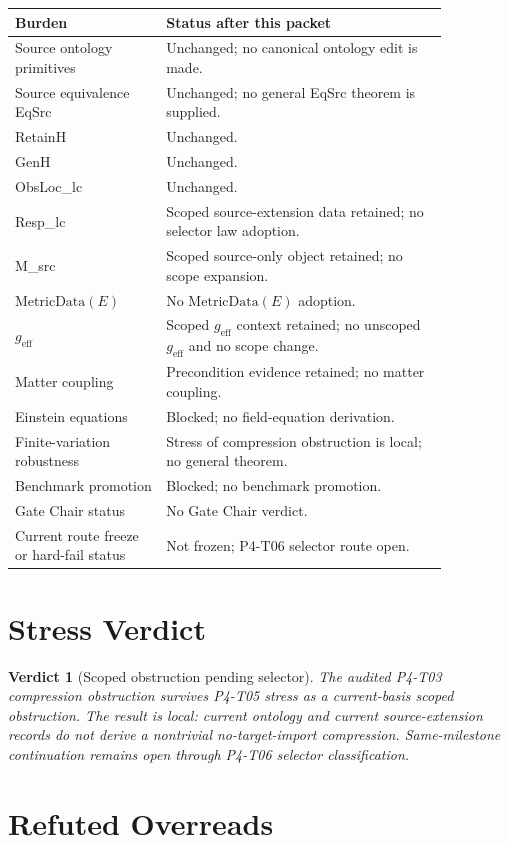 \documentclass[11pt]{article}
\newcommand{\MetricData}{\mathrm{MetricData}}
\newcommand{\geff}{g_{\mathrm{eff}}}
\newtheorem{verdict}{Verdict}
\begin{document}
\begin{longtable}{p{0.30\linewidth}p{0.56\linewidth}}
\toprule
Burden & Status after this packet \\
\midrule
Source ontology primitives & Unchanged; no canonical ontology edit is made. \\
Source equivalence EqSrc & Unchanged; no general EqSrc theorem is supplied. \\
RetainH & Unchanged. \\
GenH & Unchanged. \\
ObsLoc\_lc & Unchanged. \\
Resp\_lc & Scoped source-extension data retained; no selector law adoption. \\
M\_src & Scoped source-only object retained; no scope expansion. \\
\(\MetricData(E)\) & No \(\MetricData(E)\) adoption. \\
\(\geff\) & Scoped \(\geff\) context retained; no unscoped \(\geff\) and no scope change. \\
Matter coupling & Precondition evidence retained; no matter coupling. \\
Einstein equations & Blocked; no field-equation derivation. \\
Finite-variation robustness & Stress of compression obstruction is local; no general theorem. \\
Benchmark promotion & Blocked; no benchmark promotion. \\
Gate Chair status & No Gate Chair verdict. \\
Current route freeze or hard-fail status & Not frozen; P4-T06 selector route open. \\
\bottomrule
\end{longtable}

\section{Stress Verdict}

\begin{verdict}[Scoped obstruction pending selector]
The audited P4-T03 compression obstruction survives P4-T05 stress as a
current-basis scoped obstruction. The result is local: current ontology and
current source-extension records do not derive a nontrivial no-target-import
compression. Same-milestone continuation remains open through P4-T06 selector
classification.
\end{verdict}

\section{Refuted Overreads}
\end{document}

